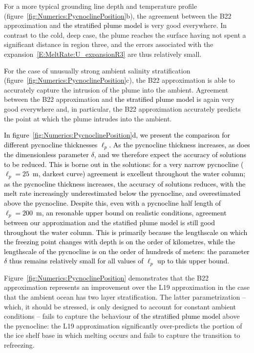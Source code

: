 \documentclass[openacc]{rsproca_new}%
\newcommand{\red}[1]{{\color{red} #1}}
\newcommand{\blue}[1]{{\color{blue} #1}}
\newcommand{\rout}[1]{\red{\st{#1}}}\newcommand{\ab}[1]{\textcolor{Green}{#1}}\newcommand{\about}[1]{\textcolor{Cyan}{\sout{#1}}}
\renewcommand{\rout}[1]{{}} %
\renewcommand{\blue}[1]{{\textcolor{black}{#1}}} %
\renewcommand{\red}[1]{{}} %
\newcommand{\lt}{\delta} %
\begin{document}
For a more typical grounding line depth and temperature profile (figure~\ref{fig:Numerics:PycnoclinePosition}b), the agreement between the B22 approximation and \blue{the stratified plume model}\rout{numerical solutions} is very good everywhere. In contrast to the cold, deep case, the plume reaches the surface having not spent a significant distance in region three, and the errors associated with the expansion~\eqref{E:MeltRate:U_expansionR3} are thus relatively small.

\rout{Finally, f}\blue{F}or the case of unusually strong ambient salinity stratification (figure~\ref{fig:Numerics:PycnoclinePosition}c), the B22 approximation is able to accurately capture the intrusion of the  plume into the ambient. Agreement between the B22 approximation and \blue{the stratified plume model}\rout{numerical solutions} is again very good everywhere and, in particular, the B22 approximation accurately predicts the point at which the plume intrudes into the ambient.

\blue{In figure~\ref{fig:Numerics:PycnoclinePosition}d, we present the comparison for different pycnocline thicknesses $\ell_p$. As the pycnocline thickness increases, as does the dimensionless parameter $\delta$, and we therefore expect the accuracy of solutions to be reduced. This is borne out in the solutions: for a very narrow pycnocline ($\ell_p = 25$~m, darkest curve) agreement is excellent throughout the water column; as the pycnocline thickness increases, the accuracy of solutions reduces, with the melt rate increasingly underestimated below the pycnocline, and overestimated above the pycnocline. Despite this, even with a pycnocline half length of $\ell_p = 200$~m, an resonable upper bound on realistic conditions, agreement between our approximation and the statified plume model is still good throughout the water column. This is primarily because the lengthscale on which the freezing point changes with depth is on the order of kilometres, while the lengthscale of the pycnocline is on the order of hundreds of meters: the parameter $\lt$ thus remains relatively small for all values of $\ell_p$ up to this upper bound.}

Figure~\ref{fig:Numerics:PycnoclinePosition} demonstrates that the B22 approximation represents an improvement over the L19 approximation in the case that the ambient ocean has two layer stratification. The latter parametrization -- which, it should be stressed, is only designed to account for constant ambient conditions -- fails to capture the behaviour \blue{of the stratified plume model} above the pycnocline: the L19 approximation significantly over-predicts the portion of the ice shelf base in which melting occurs and fails to capture the transition to refreezing.
\end{document}
